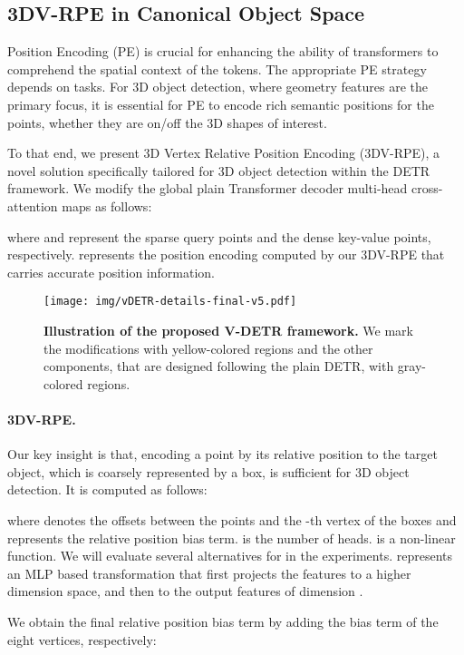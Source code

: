 \documentclass[10pt,twocolumn,letterpaper]{article}
\begin{document}
\subsection{3DV-RPE in Canonical Object Space}

Position Encoding (PE) is crucial for enhancing the ability of transformers to comprehend the spatial context of the tokens. The appropriate PE strategy depends on tasks. For 3D object detection, where geometry features are the primary focus, it is essential for PE to encode rich semantic positions for the points, \eg whether they are on/off the 3D shapes of interest. 
\vspace{0.5em}

To that end, we present 3D Vertex Relative Position Encoding (3DV-RPE), a novel solution specifically tailored for 3D object detection within the DETR framework. We modify the global plain Transformer decoder multi-head cross-attention maps as follows:

where  and  represent the sparse query points and the dense key-value points, respectively.
 represents the position encoding computed by our 3DV-RPE that carries accurate position information.

\begin{figure}[t]
\centering
\centering
\texttt{[image: img/vDETR-details-final-v5.pdf]}
\caption{\small{\textbf{Illustration of the proposed V-DETR framework.} We mark the modifications with yellow-colored regions and the other components, that are designed following the plain DETR, with gray-colored regions. 
}}
\label{fig:pipeline_details}
\end{figure}

\paragraph{3DV-RPE.}
Our key insight is that, encoding a point by its relative position to the target object, which is coarsely represented by a box, is sufficient for 3D object detection. It is computed as follows:

where  denotes the offsets between the  points and the -th vertex of the  boxes and  represents the relative position bias term.  is the number of heads.  is a non-linear function. We will evaluate several alternatives for  in the experiments.  represents an MLP based transformation that first projects the features to a higher dimension space, and then to the output features of dimension .

We obtain the final relative position bias term by adding the bias term of the eight vertices, respectively:
\end{document}
